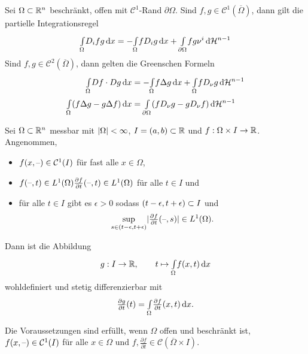 \documentclass{cheat-sheet}
\newcommand{\HM}{\mathcal{H}} %
\begin{document}
\begin{kor}
  Sei $\Omega \subset \mathbb{R}^n$ beschränkt, offen mit $\mathcal{C}^1$-Rand $\partial \Omega$. Sind $f, g \in \mathcal{C}^1(\overline{\Omega})$, dann gilt die partielle Integrationsregel
  \[ \Int{\Omega}{}{D_i f g}{x} = - \Int{\Omega}{}{f D_i g}{x} + \Int{\partial \Omega}{}{f g \nu^i}{\HM^{n-1}} \]
  Sind $f, g \in \mathcal{C}^2(\overline{\Omega})$, dann gelten die Greenschen Formeln
  \begin{align*}
    \Int{\Omega}{}{Df \cdot Dg}{x} &= - \Int{\Omega}{}{f \Delta g}{x} + \Int{\Omega}{}{f D_{\nu} g}{\HM^{n-1}}\\
    \Int{\Omega}{}{(f \Delta g - g \Delta f)}{x} &= \Int{\partial \Omega}{}{(f D_{\nu} g - g D_{\nu} f)}{\HM^{n-1}}
  \end{align*}
\end{kor}

\begin{prop}
  Sei $\Omega \subset \mathbb{R}^n$ messbar mit $\lvert\Omega\rvert < \infty$, $I = \left( a, b \right) \subset \mathbb{R}$ und $f : \Omega \times I \to \mathbb{R}$. Angenommen,
  \begin{itemize}
    \item $f(x, \text{--}) \in \mathcal{C}^1(I)$ für fast alle $x \in \Omega$,
    \item $f(\text{--}, t) \in L^1(\Omega) \tfrac{\partial f}{\partial t}(\text{--}, t) \in L^1(\Omega)$ für alle $t \in I$ und
    \item für alle $t \in I$ gibt es $\epsilon > 0$ sodass $\left( t-\epsilon, t+\epsilon \right) \subset I$ und
    \[ \sup_{s \in \left( t-\epsilon, t+\epsilon \right)} \lvert\tfrac{\partial f}{\partial t}(\text{--}, s)\rvert \in L^1(\Omega). \]
  \end{itemize}
  Dann ist die Abbildung
  \[
    g : I \to \mathbb{R}, \qquad
    t \mapsto {\textstyle \int\limits_{\Omega}^{}} f(x, t) \,\mathrm{d} x
  \]
  wohldefiniert und stetig differenzierbar mit
  \[ \tfrac{\partial g}{\partial t}(t) = {\textstyle \int\limits_{\Omega}^{}} \tfrac{\partial f}{\partial t}(x,t) \,\mathrm{d} x. \]
\end{prop}

\begin{bem}
  Die Voraussetzungen sind erfüllt, wenn $\Omega$ offen und beschränkt ist, $f(x, \text{--}) \in \mathcal{C}^1(I)$ für alle $x \in \Omega$ und $f, \tfrac{\partial f}{\partial t} \in \mathcal{C}(\overline{\Omega} \times I)$.
\end{bem}
\end{document}
